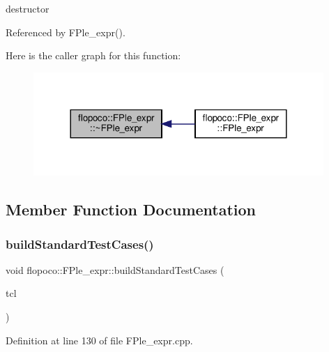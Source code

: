 destructor 



Referenced by F\+Ple\+\_\+expr().

Here is the caller graph for this function\+:
\nopagebreak
\begin{figure}[H]
\begin{center}
\leavevmode
\includegraphics[width=312pt]{d6/d71/classflopoco_1_1FPle__expr_a16703f83d631965406af69ad19d51f3e_icgraph}
\end{center}
\end{figure}


\subsection{Member Function Documentation}
\mbox{\label{classflopoco_1_1FPle__expr_a96406849979dae35af1d76bc72caa5e1}} 
\subsubsection{\texorpdfstring{build\+Standard\+Test\+Cases()}{buildStandardTestCases()}}
{\footnotesize\ttfamily void flopoco\+::\+F\+Ple\+\_\+expr\+::build\+Standard\+Test\+Cases (\begin{DoxyParamCaption}\item[{Test\+Case\+List $\ast$}]{tcl }\end{DoxyParamCaption})\hspace{0.3cm}{\ttfamily [override]}}



Definition at line 130 of file F\+Ple\+\_\+expr.\+cpp.

\mbox{\label{classflopoco_1_1FPle__expr_aba8c39a1a39c0b073acc16df66b5a836}} 
